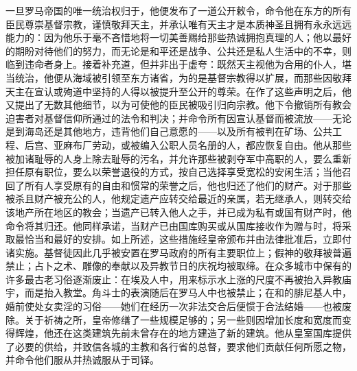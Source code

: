 一旦罗马帝国的唯一统治权归于，他便发布了一道公开敕令，命令他在东方的所有臣民尊崇基督宗教，谨慎敬拜天主，并承认唯有天主才是本质神圣且拥有永永远远能力的：因为他乐于毫不吝惜地将一切美善赐给那些热诚拥抱真理的人；他以最好的期盼对待他们的努力，而无论是和平还是战争、公共还是私人生活中的不幸，则临到违命者身上。接着补充道，但并非出于虚夸：既然天主视他为合用的仆人，堪当统治，他便从海域被引领至东方诸省，为的是基督宗教得以扩展，而那些因敬拜天主在宣认或殉道中坚持的人得以被提升至公开的尊荣。在作了这些声明之后，他又提出了无数其他细节，以为可使他的臣民被吸引归向宗教。他下令撤销所有教会迫害者对基督信仰所通过的法令和判决；并命令所有因宣认基督而被流放——无论是到海岛还是其他地方，违背他们自己意愿的——以及所有被判在矿场、公共工程、后宫、亚麻布厂劳动，或被编入公职人员名册的人，都应恢复自由。他从那些被加诸耻辱的人身上除去耻辱的污名，并允许那些被剥夺军中高职的人，要么重新担任原有职位，要么以荣誉退役的方式，按自己选择享受宽松的安闲生活；当他召回了所有人享受原有的自由和惯常的荣誉之后，他也归还了他们的财产。对于那些被杀且财产被充公的人，他规定遗产应转交给最近的亲属，若无继承人，则转交给该地产所在地区的教会；当遗产已转入他人之手，并已成为私有或国有财产时，他命令将其归还。他同样承诺，当财产已由国库购买或从国库接收作为赠与时，将采取最恰当和最好的安排。如上所述，这些措施经皇帝颁布并由法律批准后，立即付诸实施。基督徒因此几乎被安置在罗马政府的所有主要职位上；假神的敬拜被普遍禁止；占卜之术、雕像的奉献以及异教节日的庆祝均被取缔。在众多城市中保有的许多最古老习俗逐渐废止：在埃及人中，用来标示水上涨的尺度不再被抬入异教庙宇，而是抬入教堂。角斗士的表演随后在罗马人中也被禁止；在和的腓尼基人中，婚前使处女卖淫的习俗——她们在经历一次非法交合后便惯于合法结婚——也被废除。关于祈祷之所，皇帝修缮了一些规模足够的；另一些则因增加长度和宽度而变得辉煌，他还在这类建筑先前未曾存在的地方建造了新的建筑。他从皇室国库提供了必要的供给，并致信各城的主教和各行省的总督，要求他们贡献任何所愿之物，并命令他们服从并热诚服从于司铎。\par

